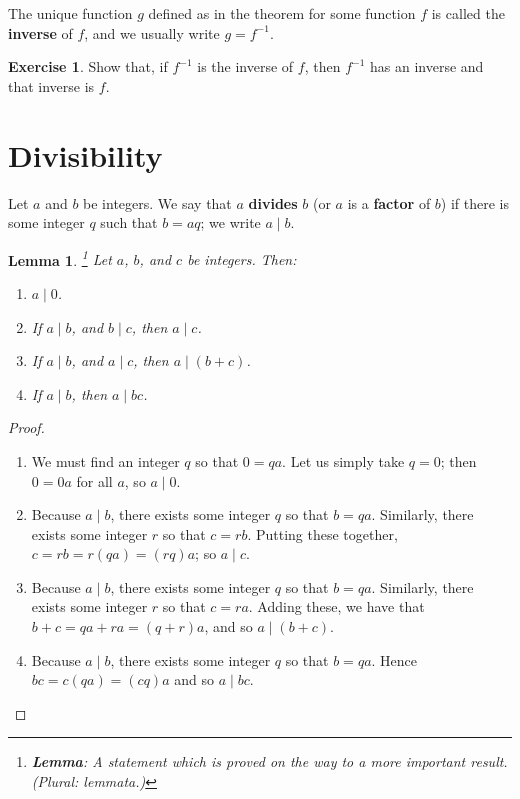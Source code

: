 \documentclass[a4paper,leqno]{article}
\numberwithin{equation}{section}
\newtheorem{lem}[equation]{Lemma}
\theoremstyle{definition}
\newtheorem{exercise}[equation]{Exercise}
\theoremstyle{remark}
\newcommand{\df}[1]{\textbf{#1}}
\begin{document}
The unique function $ g $ defined as in the theorem for some function $ f $ is called the \df{inverse} of $ f $, and we usually write $ g = f^{-1} $.

\begin{exercise}
  Show that, if $ f^{-1} $ is the inverse of $ f $, then $ f^{-1} $ has an inverse and that inverse is $ f $.
\end{exercise}

\section{Divisibility}
Let $ a $ and $ b $ be integers. We say that $ a $ \df{divides} $ b $ (or $ a $ is a \df{factor} of $ b $) if there is some integer $ q $ such
that $ b = aq $; we write $ a \mid b $.
\begin{lem}\footnote{\df{Lemma}: A statement which is proved on the way to a more important result. (Plural: lemmata.)}\leavevmode
  Let $ a $, $ b $, and $ c $ be integers. Then:
  \begin{enumerate}
    \item $ a \mid 0 $.
    \item If $ a \mid b $, and $ b \mid c $, then $ a \mid c $.
    \item If $ a \mid b $, and $ a \mid c $, then $ a \mid (b + c) $.
    \item If $ a \mid b $, then $ a \mid bc $.
  \end{enumerate}
\end{lem}
\begin{proof}\leavevmode
  \begin{enumerate}
    \item We must find an integer $ q $ so that $ 0 = qa $. Let us simply take $ q = 0 $; then $ 0 = 0a $ for all $ a $, so $ a \mid 0 $.
    \item Because $ a \mid b $, there exists some integer $ q $ so that $ b = qa $. Similarly, there exists some integer $ r $ so that $ c = rb $.
          Putting these together, $ c = rb = r(qa) = (rq)a $; so $ a \mid c $.
    \item Because $ a \mid b $, there exists some integer $ q $ so that $ b = qa $. Similarly, there exists some integer $ r $ so that $ c = ra $.
          Adding these, we have that $ b + c = qa + ra = (q + r)a $, and so $ a \mid (b+c) $.
    \item Because $ a \mid b $, there exists some integer $ q $ so that $ b = qa $. Hence $ bc = c(qa) = (cq)a $ and so $ a \mid bc $.
  \end{enumerate}
\end{proof}
\end{document}
